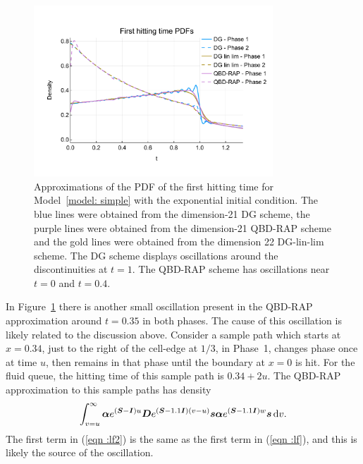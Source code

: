 \begin{figure}[h]
	\centering 
	\includegraphics[width=0.8\textwidth,trim={0cm 1.25cm 0cm 1.25cm},clip]{chapter6/figs/hitting_times_model/hitting_times/exp/pdf_order21.pdf}%
	\caption{Approximations of the PDF of the first hitting time for Model~\ref{model: simple} with the exponential initial condition. The blue lines were obtained from the dimension-21 DG scheme, the purple lines were obtained from the dimension-21 QBD-RAP scheme and the gold lines were obtained from the dimension 22 DG-lin-lim scheme. The DG scheme displays oscillations around the discontinuities at \(t=1\). The QBD-RAP scheme has oscillations near \(t=0\) and \(t=0.4\). } 
	\label{fig: hitting time oscillation exp} 
\end{figure}
In Figure~\ref{fig: hitting time oscillation exp} there is another small oscillation present in the QBD-RAP approximation around \(t=0.35\) in both phases. The cause of this oscillation is likely related to the discussion above. Consider a sample path which starts at \(x=0.34\), just to the right of the cell-edge at \(1/3\), in Phase~1, changes phase once at time \(u\), then remains in that phase until the boundary at \(x=0\) is hit. For the fluid queue, the hitting time of this sample path is \(0.34 + 2u\). The QBD-RAP approximation to this sample paths has density
\begin{align}
	\int_{v=u}^\infty \boldsymbol \alpha e^{(\boldsymbol S - \boldsymbol I)u} \boldsymbol D e^{(\boldsymbol S - 1.1\boldsymbol I)(v-u)}\boldsymbol s \boldsymbol \alpha e^{(\boldsymbol S-1.1\boldsymbol I)w}\boldsymbol s \, \mathrm{d} v.\label{eqn :lf2}
\end{align}
The first term in (\ref{eqn :lf2}) is the same as the first term in (\ref{eqn :lf}), and this is likely the source of the oscillation. 




